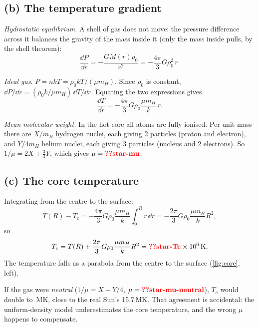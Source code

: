\documentclass[11pt,a4paper]{article}
\begin{document}
\subsection*{(b) The temperature gradient}
\textit{Hydrostatic equilibrium.}
A shell of gas does not move: the pressure difference across it balances the gravity of the mass inside it (only the mass inside pulls, by the shell theorem):
\begin{equation}
  \frac{\dd P}{\dd r}=-\frac{GM(r)\rho_0}{r^2}=-\frac{4\pi}{3}G\rho_0^2\,r .
\end{equation}

\textit{Ideal gas.}
$P=nkT=\rho_0kT/(\mu m_H)$.
Since $\rho_0$ is constant, $\dd P/\dd r=(\rho_0k/\mu m_H)\,\dd T/\dd r$.
Equating the two expressions gives
\begin{equation}
  \frac{\dd T}{\dd r}=-\frac{4\pi}{3}G\rho_0\frac{\mu m_H}{k}\,r .
\end{equation}

\textit{Mean molecular weight.}
In the hot core all atoms are fully ionised.
Per unit mass there are $X/m_H$ hydrogen nuclei, each giving 2 particles (proton and electron), and $Y/4m_H$ helium nuclei, each giving 3 particles (nucleus and 2 electrons).
So $1/\mu=2X+\tfrac34Y$, which gives $\mu=\val{star-mu}$.

\subsection*{(c) The core temperature}
Integrating from the centre to the surface:
\begin{equation}
  T(R)-T_c=-\frac{4\pi}{3}G\rho_0\frac{\mu m_H}{k}\int_0^Rr\,\dd r=-\frac{2\pi}{3}G\rho_0\frac{\mu m_H}{k}R^2,
\end{equation}
so
\begin{equation}
  T_c=T(R)+\frac{2\pi}{3}G\rho_0\frac{\mu m_H}{k}R^2=\val{star-Tc}\times10^6\,\mathrm{K}.
\end{equation}
The temperature falls as a parabola from the centre to the surface (\cref{fig:core}, left).

If the gas were \emph{neutral} ($1/\mu=X+Y/4$, $\mu=\val{star-mu-neutral}$), $T_c$ would double to \,MK, close to the real Sun's 15.7\,MK.
That agreement is accidental: the uniform-density model underestimates the core temperature, and the wrong $\mu$ happens to compensate.

\end{document}
